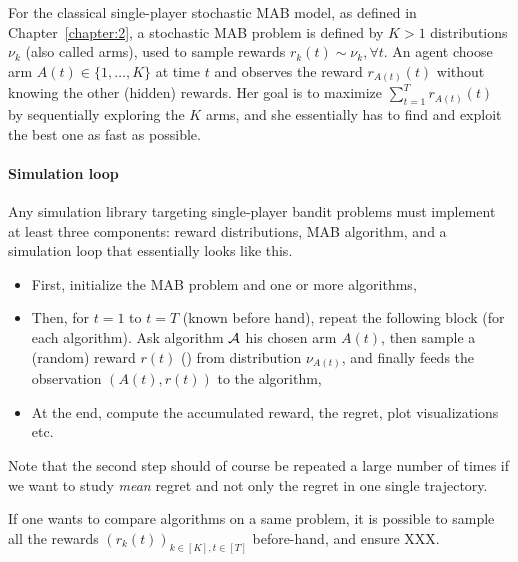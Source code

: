For the classical single-player stochastic MAB model, as defined in Chapter~\ref{chapter:2},
a stochastic MAB problem is defined by $K>1$ distributions $\nu_k$ (also called arms),
used to sample \iid{} rewards $r_k(t) \sim \nu_k, \forall t$.
An agent choose arm $A(t)\in\{1,\dots,K\}$ at time $t$ and observes the reward $r_{A(t)}(t)$ without knowing the other (hidden) rewards.
Her goal is to maximize $\sum_{t=1}^T r_{A(t)}(t)$ by sequentially exploring the $K$ arms, and she essentially has to find and exploit the best one as fast as possible.

\paragraph{Simulation loop}
%
Any simulation library targeting single-player bandit problems must implement at least three components:
reward distributions, MAB algorithm, and a simulation loop that essentially looks like this.
\begin{itemize}
    \item First, initialize the MAB problem and one or more algorithms,
    \item Then, for $t=1$ to $t=T$ (known before hand), repeat the following block (for each algorithm). Ask algorithm $\mathcal{A}$ his chosen arm $A(t)$, then sample a (random) reward $r(t)$ (\iid) from distribution $\nu_{A(t)}$, and finally feeds the observation $(A(t), r(t))$ to the algorithm,
    \item At the end, compute the accumulated reward, the regret, plot visualizations etc.
\end{itemize}
%
Note that the second step should of course be repeated a large number of times if we want to study \emph{mean} regret and not only the regret in one single trajectory.

If one wants to compare algorithms on a same problem, it is possible to sample all the rewards $(r_k(t))_{k\in[K], t\in[T]}$ before-hand, and ensure XXX.


